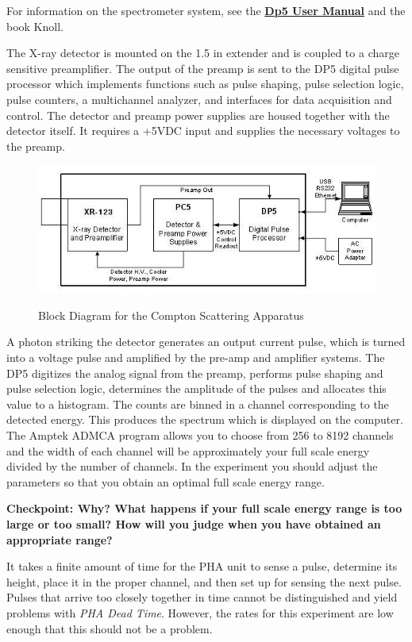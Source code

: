 \documentclass{../lab}
\begin{document}
For information on the spectrometer system, see the \href{http://experimentationlab.berkeley.edu/sites/default/files/images/DP5\_User\_Manual\_A1.pdf}{\textbf{Dp5 User Manual}} and the book Knoll.

The X-ray detector is mounted on the 1.5 in extender and is coupled to a charge sensitive preamplifier. The output of the preamp is sent to the DP5 digital pulse processor which implements functions such as pulse shaping, pulse selection logic, pulse counters, a multichannel analyzer, and interfaces for data acquisition and control. The detector and preamp power supplies are housed together with the detector itself. It requires a +5VDC input and supplies the necessary voltages to the preamp.

\begin{figure}
    \centering
    \href{http://experimentationlab.berkeley.edu/sites/default/files/images/COMimage01.jpg}{\includegraphics[width=0.7\linewidth]{images/COMimage01.jpg}}
    \caption{Block Diagram for the Compton Scattering Apparatus}
    \label{COMimage01}
\end{figure}

A photon striking the detector generates an output current pulse, which is turned into a voltage pulse and amplified by the pre-amp and amplifier systems. The DP5 digitizes the analog signal from the preamp, performs pulse shaping and pulse selection logic, determines the amplitude of the pulses and allocates this value to a histogram. The counts are binned in a channel corresponding to the detected energy. This produces the spectrum which is displayed on the computer. The Amptek ADMCA program allows you to choose from 256 to 8192 channels and the width of each channel will be approximately your full scale energy divided by the number of channels. In the experiment you should adjust the parameters so that you obtain an optimal full scale energy range. 

\textbf{Checkpoint: Why? What happens if your full scale energy range is too large or too small? How will you judge when you have obtained an appropriate range?}

It takes a finite amount of time for the PHA unit to sense a pulse, determine its height, place it in the proper channel, and then set up for sensing the next pulse. Pulses that arrive too closely together in time cannot be distinguished and yield problems with \emph{PHA Dead Time}. However, the rates for this experiment are low enough that this should not be a problem.
\end{document}
